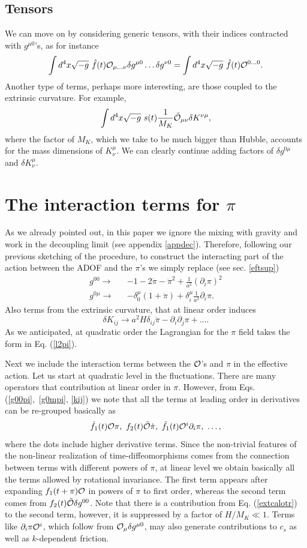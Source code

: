 \documentclass[11pt,amsmath,floats,floatfix,nofootinbib,secnumarabic, superscriptaddress, tightenlines]{revtex4}
\newcommand{\beq}{\begin{equation}}
\newcommand{\eeq}{\end{equation}}
\newcommand{\bea}{\begin{eqnarray}}
\newcommand{\eea}{\end{eqnarray}}
\newcommand{\calo}{{\cal O}}
\begin{document}
{\subsection{Tensors}\label{tensors}


We can move on by considering generic tensors, with their indices contracted with  $g^{\mu0}$'s, as for instance
\beq
\int d^4x \sqrt{-g} ~\hat f(t)\calo_{\mu\ldots\nu} \delta g^{\mu0}\ldots \delta g^{\nu0}=\int d^4x \sqrt{-g}~\hat f(t)\calo^{0 \ldots 0}.
\eeq
Another type of terms, perhaps more interesting, are those coupled to the extrinsic curvature. For example,
\beq
\label{extcalo}
\int d^4x \sqrt{-g} ~s(t)\frac{1}{M_K} \tilde\calo_{\mu\nu} \delta K^{\nu\mu},
\eeq
where the factor of $M_K$, which we take to be much bigger than Hubble, accounts for the mass dimensions of $K^\mu_\nu$.
We can clearly continue adding factors of  $\delta g^{0\mu}$ and $\delta K^\mu_\nu$.

\section{The interaction terms for {\Large{$\pi$}}}\label{secpions}

As we already pointed out, in this paper we ignore the mixing with gravity and work in the decoupling limit (see appendix \ref{appdec}). Therefore, following our previous sketching of the procedure, to construct the interacting part of the action between the ADOF and the $\pi$'s we simply replace (see sec. \ref{eftsup})
\bea
g^{00} \to && -1 -2\dot\pi -\dot\pi^2 +\frac{1}{a^2}(\partial_i\pi)^2 \label{g00pi}\\
g^{0\mu} \to && -\delta^\mu_0 (1+\dot\pi) + \delta^\mu_i \frac{1}{a^2}\partial_i\pi\label{g0mpi}.
\eea
Also terms from the extrinsic curvature, that at linear order induces
\beq
\label{kij}
\delta K_{ij} \to a^2H\delta_{ij} \dot\pi - \partial_i\partial_j \pi + \ldots.
\eeq
\noindent As we anticipated, at quadratic order the Lagrangian for the $\pi$ field takes the form in Eq. (\ref{l2pi}). 

Next we include the interaction terms between the $\calo$'s and $\pi$ in the effective action. Let us start at quadratic level in the fluctuations. There are many operators that contribution at linear order in $\pi$. However, from Eqs. (\ref{g00pi},~\ref{g0mpi}, \ref{kij}) we note that all the terms at leading order in derivatives can be re-grouped basically as
\beq
\label{operlin}
\dot f_1(t) \calo\pi,~ f_2(t)\tilde\calo\dot\pi
,~\tilde f_1(t)\calo^i \partial_i \pi,~\ldots,
 \eeq
where the dots include higher derivative terms. Since the non-trivial features of the non-linear realization of time-diffeomorphisms comes from the connection between terms with different powers of $\pi$, at linear level we obtain basically all the terms allowed by rotational invariance.
The first term appears after expanding $f_1(t+\pi)\calo$ in powers of $\pi$ to first order, whereas the second term comes from $f_2(t) \tilde\calo \delta g^{00}$. Note that there is a contribution from Eq. (\ref{extcalotr}) to the second term, however, it is suppressed by a factor of $H/M_K \ll 1$. Terms like $\partial_i\pi\calo^i$, which follow from $\calo_\mu \delta g^{\mu0}$, may also generate contributions to $c_s$ as well as  $k$-dependent friction.  

}
\end{document}
